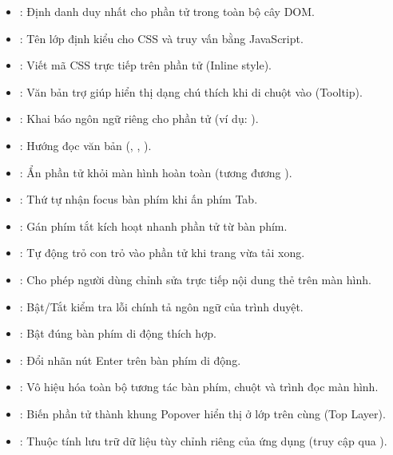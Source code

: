 \begin{itemize}
    \item {}: Định danh duy nhất cho phần tử trong toàn bộ cây DOM.
    \item {}: Tên lớp định kiểu cho CSS và truy vấn bằng JavaScript.
    \item {}: Viết mã CSS trực tiếp trên phần tử (Inline style).
    \item {}: Văn bản trợ giúp hiển thị dạng chú thích khi di chuột vào (Tooltip).
    \item {}: Khai báo ngôn ngữ riêng cho phần tử (ví dụ: ).
    \item {}: Hướng đọc văn bản (, , ).
    \item {}: Ẩn phần tử khỏi màn hình hoàn toàn (tương đương ).
    \item {}: Thứ tự nhận focus bàn phím khi ấn phím Tab.
    \item {}: Gán phím tắt kích hoạt nhanh phần tử từ bàn phím.
    \item {}: Tự động trỏ con trỏ vào phần tử khi trang vừa tải xong.
    \item {}: Cho phép người dùng chỉnh sửa trực tiếp nội dung thẻ trên màn hình.
    \item {}: Bật/Tắt kiểm tra lỗi chính tả ngôn ngữ của trình duyệt.
    \item {}: Bật đúng bàn phím di động thích hợp.
    \item {}: Đổi nhãn nút Enter trên bàn phím di động.
    \item {}: Vô hiệu hóa toàn bộ tương tác bàn phím, chuột và trình đọc màn hình.
    \item {}: Biến phần tử thành khung Popover hiển thị ở lớp trên cùng (Top Layer).
    \item {}: Thuộc tính lưu trữ dữ liệu tùy chỉnh riêng của ứng dụng (truy cập qua ).
\end{itemize}
